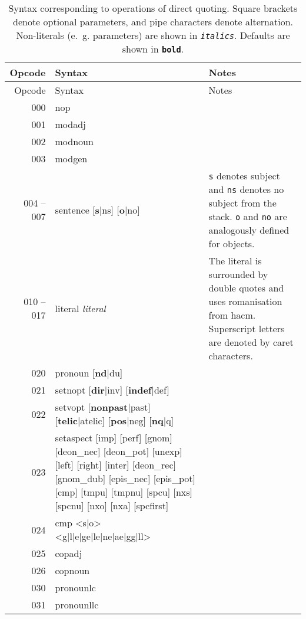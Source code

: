 \documentclass{book}
\begin{document}
\begin{longtabu}[c]{r|>{\ttfamily}Y|Y}
    \caption{Syntax corresponding to operations of direct quoting. Square brackets denote optional parameters, and pipe characters denote alternation. Non-literals (e.~g. parameters) are shown in \texttt{\textit{italics}}. Defaults are shown in \texttt{\textbf{bold}}.} \\
    
    Opcode & \textnormal{Syntax} & Notes \\
    \hline
    \endfirsthead
    
    Opcode & \textnormal{Syntax} & Notes \\
    \hline
    \endhead
    
    \endfoot
    
    \endlastfoot

    000 & nop & \\
    001 & modadj & \\
    002 & modnoun & \\
    003 & modgen & \\
    004 -- 007 & sentence [\textbf{s}|ns] [\textbf{o}|no] & \texttt{s} denotes subject and \texttt{ns} denotes no subject from the stack. \texttt{o} and \texttt{no} are analogously defined for objects. \\
    010 -- 017 & literal  \textit{literal} & The literal is surrounded by double quotes and uses romanisation from hacm. Superscript letters are denoted by caret characters. \\
    020 & pronoun  [\textbf{nd}|du] & \\
    021 & setnopt [\textbf{dir}|inv] [\textbf{indef}|def] & \\
    022 & setvopt [\textbf{nonpast}|past] [\textbf{telic}|atelic] [\textbf{pos}|neg] [\textbf{nq}|q] & \\
    023 & setaspect [imp] [perf] [gnom] [deon\_nec] [deon\_pot] [unexp] [left] [right] [inter] [deon\_rec] [gnom\_dub] [epis\_nec] [epis\_pot] [cmp] [tmpu] [tmpnu] [spcu] [nxs] [spcnu] [nxo] [nxa] [spcfirst] & \\
    024 & cmp <s|o> <g|l|e|ge|le|ne|ae|gg|ll> \\
    025 & copadj & \\
    026 & copnoun & \\
    030 & pronounlc & \\
    031 & pronounllc & \\

\end{longtabu}
\end{document}

